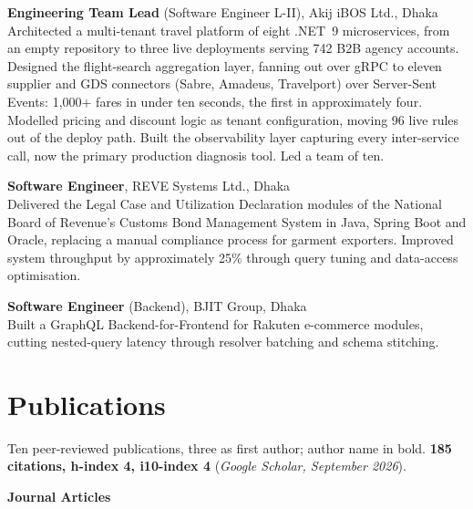 \documentclass[a4paper,11pt]{article}
\let\origsection\section
\renewcommand{\section}[1]{\needspace{7\baselineskip}\origsection{#1}}
\newenvironment{datedlist}
  {\begin{list}{}{%
     \setlength{\leftmargin}{3.3cm}\setlength{\labelwidth}{2.9cm}
     \setlength{\labelsep}{0.4cm}\setlength{\itemsep}{5pt}
     \setlength{\parsep}{0pt}\setlength{\topsep}{4pt}
     \renewcommand{\makelabel}[1]{##1\hfill}}%
   \interlinepenalty=10000 }
  {\end{list}}
\begin{document}
\begin{datedlist}
\item[2024 -- Present] \textbf{Engineering Team Lead} (Software Engineer L-II),
  Akij iBOS Ltd., Dhaka\\
  Architected a multi-tenant travel platform of eight .NET~9 microservices, from an empty
  repository to three live deployments serving 742 B2B agency accounts. Designed the
  flight-search aggregation layer, fanning out over gRPC to eleven supplier and GDS
  connectors (Sabre, Amadeus, Travelport) over Server-Sent Events: 1,000+ fares in under ten
  seconds, the first in approximately four. Modelled pricing and discount logic as tenant
  configuration, moving 96 live rules out of the deploy path. Built the observability layer
  capturing every inter-service call, now the primary production diagnosis tool. Led a team
  of ten.

\item[2023 -- 2024] \textbf{Software Engineer}, REVE Systems Ltd., Dhaka\\
  Delivered the Legal Case and Utilization Declaration modules of the National Board of
  Revenue's Customs Bond Management System in Java, Spring Boot and Oracle, replacing a
  manual compliance process for garment exporters. Improved system throughput by
  approximately 25\% through query tuning and data-access optimisation.

\item[2022 -- 2023] \textbf{Software Engineer} (Backend), BJIT Group, Dhaka\\
  Built a GraphQL Backend-for-Frontend for Rakuten e-commerce modules, cutting nested-query
  latency through resolver batching and schema stitching.
\end{datedlist}

\section{Publications}

Ten peer-reviewed publications, three as first author; author name in bold.
\textbf{185 citations, h-index 4, i10-index 4}
({\small\textit{Google Scholar, September 2026}}).

\vspace{6pt}
\textbf{\normalsize Journal Articles}
\nopagebreak
\vspace{-2pt}
\end{document}
